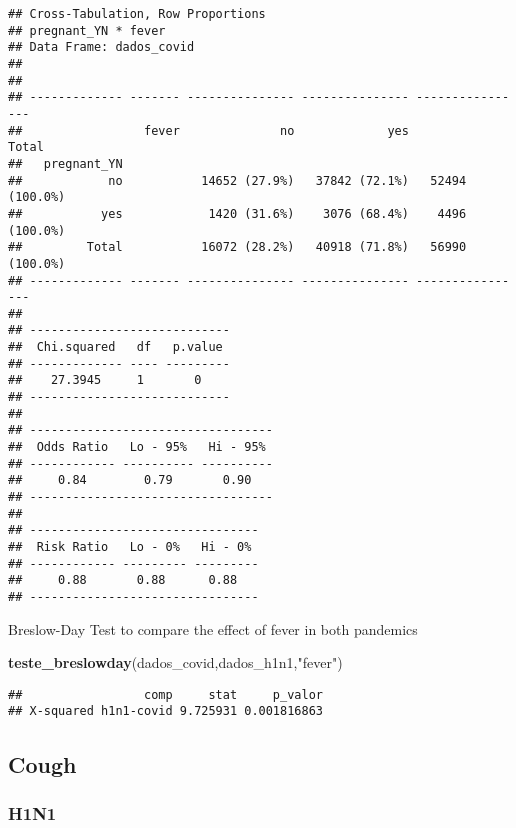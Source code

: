 \documentclass[
]{article}
\newenvironment{Shaded}{\begin{snugshade}}{\end{snugshade}}
\newcommand{\DataTypeTok}[1]{\textcolor[rgb]{0.13,0.29,0.53}{#1}}
\newcommand{\DecValTok}[1]{\textcolor[rgb]{0.00,0.00,0.81}{#1}}
\newcommand{\KeywordTok}[1]{\textcolor[rgb]{0.13,0.29,0.53}{\textbf{#1}}}
\newcommand{\NormalTok}[1]{#1}
\newcommand{\OperatorTok}[1]{\textcolor[rgb]{0.81,0.36,0.00}{\textbf{#1}}}
\newcommand{\OtherTok}[1]{\textcolor[rgb]{0.56,0.35,0.01}{#1}}
\newcommand{\StringTok}[1]{\textcolor[rgb]{0.31,0.60,0.02}{#1}}
\begin{document}
\begin{verbatim}
## Cross-Tabulation, Row Proportions  
## pregnant_YN * fever  
## Data Frame: dados_covid  
## 
## 
## ------------- ------- --------------- --------------- ----------------
##                 fever              no             yes            Total
##   pregnant_YN                                                         
##            no           14652 (27.9%)   37842 (72.1%)   52494 (100.0%)
##           yes            1420 (31.6%)    3076 (68.4%)    4496 (100.0%)
##         Total           16072 (28.2%)   40918 (71.8%)   56990 (100.0%)
## ------------- ------- --------------- --------------- ----------------
## 
## ----------------------------
##  Chi.squared   df   p.value 
## ------------- ---- ---------
##    27.3945     1       0    
## ----------------------------
## 
## ----------------------------------
##  Odds Ratio   Lo - 95%   Hi - 95% 
## ------------ ---------- ----------
##     0.84        0.79       0.90   
## ----------------------------------
## 
## --------------------------------
##  Risk Ratio   Lo - 0%   Hi - 0% 
## ------------ --------- ---------
##     0.88       0.88      0.88   
## --------------------------------
\end{verbatim}

Breslow-Day Test to compare the effect of fever in both pandemics

\begin{Shaded}
\begin{Highlighting}[]
\KeywordTok{teste_breslowday}\NormalTok{(dados_covid,dados_h1n1,}\StringTok{"fever"}\NormalTok{)}
\end{Highlighting}
\end{Shaded}

\begin{verbatim}
##                 comp     stat     p_valor
## X-squared h1n1-covid 9.725931 0.001816863
\end{verbatim}

\hypertarget{cough}{%
\subsection{Cough}\label{cough}}

\hypertarget{h1n1-12}{%
\subsubsection{H1N1}\label{h1n1-12}}

\begin{Shaded}
\end{Shaded}
\end{document}
